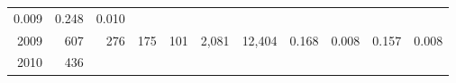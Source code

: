 \documentclass[]{article}
\begin{document}
\begin{longtable}[]{@{}rrrrrrrrrrr@{}}
\begin{minipage}[t]{0.05\columnwidth}
0.009\strut
\end{minipage} & \begin{minipage}[t]{0.10\columnwidth}\raggedleft\strut
0.248\strut
\end{minipage} & \begin{minipage}[t]{0.04\columnwidth}\raggedleft\strut
0.010\strut
\end{minipage}\tabularnewline
\begin{minipage}[t]{0.06\columnwidth}\raggedleft\strut
2009\strut
\end{minipage} & \begin{minipage}[t]{0.07\columnwidth}\raggedleft\strut
607\strut
\end{minipage} & \begin{minipage}[t]{0.07\columnwidth}\raggedleft\strut
276\strut
\end{minipage} & \begin{minipage}[t]{0.07\columnwidth}\raggedleft\strut
175\strut
\end{minipage} & \begin{minipage}[t]{0.07\columnwidth}\raggedleft\strut
101\strut
\end{minipage} & \begin{minipage}[t]{0.07\columnwidth}\raggedleft\strut
2,081\strut
\end{minipage} & \begin{minipage}[t]{0.05\columnwidth}\raggedleft\strut
12,404\strut
\end{minipage} & \begin{minipage}[t]{0.09\columnwidth}\raggedleft\strut
0.168\strut
\end{minipage} & \begin{minipage}[t]{0.05\columnwidth}\raggedleft\strut
0.008\strut
\end{minipage} & \begin{minipage}[t]{0.10\columnwidth}\raggedleft\strut
0.157\strut
\end{minipage} & \begin{minipage}[t]{0.04\columnwidth}\raggedleft\strut
0.008\strut
\end{minipage}\tabularnewline
\begin{minipage}[t]{0.06\columnwidth}\raggedleft\strut
2010\strut
\end{minipage} & \begin{minipage}[t]{0.07\columnwidth}\raggedleft\strut
436\strut
\end{minipage} & \begin{minipage}[t]{0.07\columnwidth}\raggedleft\strut

\end{minipage}
\end{longtable}
\end{document}
